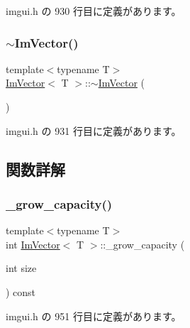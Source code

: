  imgui.\+h の 930 行目に定義があります。

\mbox{\label{class_im_vector_a9b782359ca26eaa1a6a6138fcf341c54}} 
\subsubsection{\texorpdfstring{$\sim$\+Im\+Vector()}{~ImVector()}}
{\footnotesize\ttfamily template$<$typename T$>$ \\
\mbox{\hyperlink{class_im_vector}{Im\+Vector}}$<$ T $>$\+::$\sim$\mbox{\hyperlink{class_im_vector}{Im\+Vector}} (\begin{DoxyParamCaption}{ }\end{DoxyParamCaption})\hspace{0.3cm}{\ttfamily [inline]}}



 imgui.\+h の 931 行目に定義があります。



\subsection{関数詳解}
\mbox{\label{class_im_vector_af9dfc79dfd89c904830bebc492a18310}} 
\subsubsection{\texorpdfstring{\+\_\+grow\+\_\+capacity()}{\_grow\_capacity()}}
{\footnotesize\ttfamily template$<$typename T$>$ \\
int \mbox{\hyperlink{class_im_vector}{Im\+Vector}}$<$ T $>$\+::\+\_\+grow\+\_\+capacity (\begin{DoxyParamCaption}\item[{int}]{size }\end{DoxyParamCaption}) const\hspace{0.3cm}{\ttfamily [inline]}}



 imgui.\+h の 951 行目に定義があります。

\mbox{\label{class_im_vector_a3e4424d3fca190894598a6575f9d2401}} 
